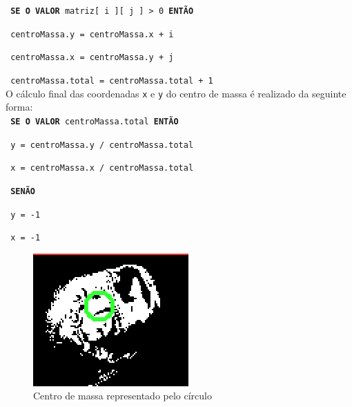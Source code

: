 \documentclass[12pt]{article}
\begin{document}
\hspace{0.4cm} \texttt{\footnotesize{ \textbf{SE O VALOR} matriz[ i ][ j ] > 0 \textbf{ENT\~AO} }}

\hspace{0.6cm} \texttt{\footnotesize{ centroMassa.y = centroMassa.x + i}}

\hspace{0.6cm} \texttt{\footnotesize{ centroMassa.x = centroMassa.y + j}}

\hspace{0.6cm} \texttt{\footnotesize{ centroMassa.total = centroMassa.total + 1}}\\


\noindent O c\'alculo final das coordenadas \texttt{x} e \texttt{y} do centro de massa \'e realizado da seguinte forma:\\

\hspace{0.4cm} \texttt{\footnotesize{ \textbf{SE O VALOR} centroMassa.total \textbf{ENT\~AO} }}

\hspace{0.6cm} \texttt{\footnotesize{ y = centroMassa.y / centroMassa.total}}

\hspace{0.6cm} \texttt{\footnotesize{ x = centroMassa.x / centroMassa.total}}

\hspace{0.4cm} \texttt{\footnotesize{ \textbf{SEN\~AO}}}

\hspace{0.6cm} \texttt{\footnotesize{ y = -1}}

\hspace{0.6cm} \texttt{\footnotesize{ x = -1}}

	\begin{figure}[ht!]
		\begin{center}
			\includegraphics[scale=0.7]{img/centromassa.png}
			\footnotesize \caption{Centro de massa representado pelo c\'irculo}
		\end{center}
	\end{figure}	
\end{document}

